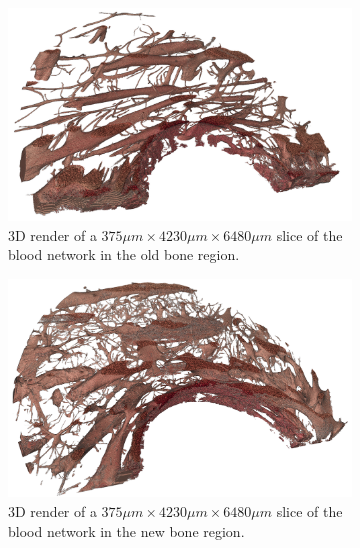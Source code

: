 \begin{figure}
    \centering
    \begin{subfigure}[b]{\linewidth}
        \includegraphics[width=\linewidth]{figures/blood_old_bone_100.png}
        \caption{3D render of a $375\mu m \times 4230\mu m \times 6480\mu m$ slice of the blood network in the old bone region.}
        \label{fig:blood-old-slice}
    \end{subfigure}
    \begin{subfigure}[b]{\linewidth}
        \includegraphics[width=\linewidth]{figures/blood_new_bone_100.png}
        \caption{3D render of a $375\mu m \times 4230\mu m \times 6480\mu m$ slice of the blood network in the new bone region.}
        \label{fig:blood-new-slice}
    \end{subfigure}
    \begin{subfigure}[b]{.45\linewidth}

\end{subfigure}
\end{figure}
